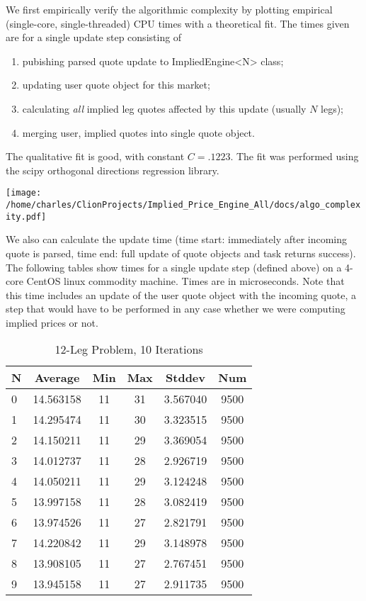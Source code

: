 \documentclass{article}
\begin{document}
We first empirically verify the algorithmic complexity by plotting empirical (single-core, single-threaded) CPU times with a theoretical fit. The times given are for a single update step consisting of 

\begin{enumerate}
\item pubishing parsed quote update to ImpliedEngine<N> class;
\item updating user quote object for this market;
\item calculating {\it all} implied leg quotes affected by this update (usually $N$ legs);
\item merging user, implied quotes into single quote object.
\end{enumerate}

The qualitative fit is good, with constant $C=.1223$. The fit was performed using the scipy orthogonal directions regression library.

\texttt{[image: /home/charles/ClionProjects/Implied\_Price\_Engine\_All/docs/algo\_complexity.pdf]}


We also can calculate the update time (time start: immediately after incoming quote is parsed, time end: full update of quote objects and task returns success).  The following tables show times for a single update step (defined above) on a 4-core CentOS linux commodity machine. Times are in microseconds. Note that this time includes an update of the user quote object with the incoming quote, a step that would have to be performed in any case whether we were computing implied prices or not.
 
\clearpage
\begin{table}
\centering
\begin{tabular}{|l|c|c|c|c|c|}
\hline
N & Average & Min & Max & Stddev & Num \\
\hline
0 & 14.563158 & 11 & 31 & 3.567040 & 9500 \\ 
1 & 14.295474 & 11 & 30 & 3.323515 & 9500 \\ 
2 & 14.150211 & 11 & 29 & 3.369054 & 9500 \\ 
3 & 14.012737 & 11 & 28 & 2.926719 & 9500 \\ 
4 & 14.050211 & 11 & 29 & 3.124248 & 9500 \\ 
5 & 13.997158 & 11 & 28 & 3.082419 & 9500 \\ 
6 & 13.974526 & 11 & 27 & 2.821791 & 9500 \\ 
7 & 14.220842 & 11 & 29 & 3.148978 & 9500 \\ 
8 & 13.908105 & 11 & 27 & 2.767451 & 9500 \\ 
9 & 13.945158 & 11 & 27 & 2.911735 & 9500 \\ 
\hline
\end{tabular}
\caption{12-Leg Problem, 10 Iterations}
\label{tab:template}
\end{table}
\end{document}
